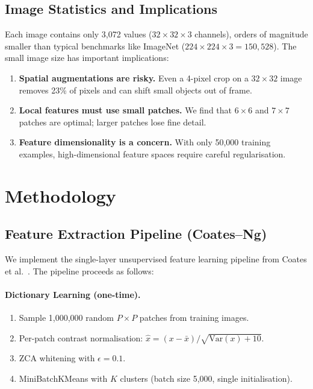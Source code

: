 \documentclass[11pt,a4paper]{article}
\begin{document}
\subsection{Image Statistics and Implications}

Each image contains only 3,072 values ($32 \times 32 \times 3$ channels),
orders of magnitude smaller than typical benchmarks like ImageNet ($224 \times
224 \times 3 = 150{,}528$).  The small image size has important implications:

\begin{enumerate}[nosep]
  \item \textbf{Spatial augmentations are risky.} Even a 4-pixel crop on a
        $32 \times 32$ image removes 23\% of pixels and can shift small objects
        out of frame.
  \item \textbf{Local features must use small patches.} We find that $6
        \times 6$ and $7 \times 7$ patches are optimal; larger patches lose
        fine detail.
  \item \textbf{Feature dimensionality is a concern.} With only 50,000
        training examples, high-dimensional feature spaces require careful
        regularisation.
\end{enumerate}

\section{Methodology}
\label{sec:methodology}

\subsection{Feature Extraction Pipeline (Coates--Ng)}
\label{sec:coates}

We implement the single-layer unsupervised feature learning pipeline from
Coates et al.~\cite{coates2011analysis}.  The pipeline proceeds as follows:

\paragraph{Dictionary Learning (one-time).}
\begin{enumerate}[nosep]
  \item Sample 1,000,000 random $P \times P$ patches from training images.
  \item Per-patch contrast normalisation:
        $\hat{x} = (x - \bar{x}) / \sqrt{\mathrm{Var}(x) + 10}$.
  \item ZCA whitening with $\epsilon = 0.1$.
  \item MiniBatchKMeans with $K$ clusters (batch size 5,000, single
        initialisation).
\end{enumerate}
\end{document}
